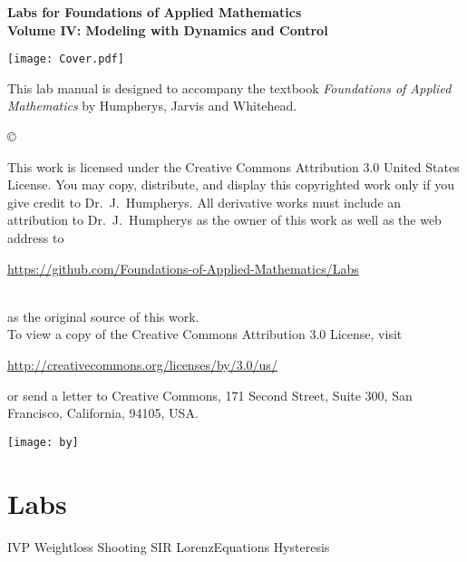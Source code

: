 \documentclass[nociteref]{SIAM-GH-book}
\begin{document}

\thispagestyle{empty} %

\begin{center}
{\huge \bf Labs for Foundations of Applied Mathematics} \\
\vspace{5mm}
{\Large \bf Volume IV: Modeling with Dynamics and Control}
\vspace{20mm}

\texttt{[image: Cover.pdf]}
\end{center}
\frontmatter



\begin{thepreface} %

This lab manual is designed to accompany the textbook \emph{Foundations of Applied Mathematics} by Humpherys, Jarvis and Whitehead.

\vfill
\copyright{This work is licensed under the Creative Commons Attribution 3.0 United States
License.  You may copy, distribute, and display this copyrighted work only if you give
credit to Dr.~J.~Humpherys. All derivative works must include an attribution to Dr.~J.~Humpherys as the owner of this work as well as the web address to
\\\centerline{\url{https://github.com/Foundations-of-Applied-Mathematics/Labs}}\\as the original source of this work.
\\To view a copy of the Creative Commons Attribution 3.0 License, visit
\\\centerline{\url{http://creativecommons.org/licenses/by/3.0/us/}} or send a letter to Creative Commons, 171 Second Street, Suite 300, San Francisco, California, 94105, USA.}

\vfill
\centering\texttt{[image: by]}
\vfill
\end{thepreface}

\setcounter{tocdepth}{1}
\tableofcontents

\mainmatter %

\part{Labs}
{IVP}
{Weightloss}
{Shooting}
{SIR}
{LorenzEquations}
{Hysteresis}
\end{document}
